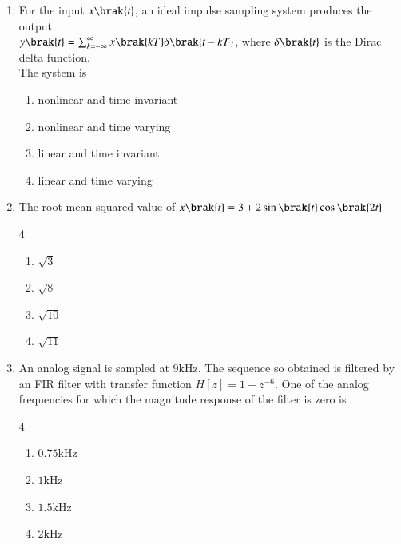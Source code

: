 \documentclass[journal,12pt,onecolumn]{IEEEtran}
\theoremstyle{remark}
\begin{document}
\begin{enumerate}
\vspace{0.5cm}

\item For the input $x\brak{t}$, an ideal impulse sampling system produces the output\\ $y\brak{t}=\sum_{k=-\infty}^{\infty}x\brak{kT}\delta\brak{t-kT}$, where $\delta\brak{t}$ is the Dirac delta function.\\ The system is \par  \hfill{}
    \begin{enumerate}
        \item nonlinear and time invariant
        \item nonlinear and time varying
        \item linear and time invariant
        \item linear and time varying
\end{enumerate} 

\vspace{0.5cm}

\item The root mean squared value of $x\brak{t}=3+2\sin\brak{t}\cos\brak{2t}$ \par  \hfill{}
\begin{multicols}{4}
    \begin{enumerate}
        \item $\sqrt{3}$
        \item $\sqrt{8}$
        \item $\sqrt{10}$
        \item $\sqrt{11}$
\end{enumerate}
\end{multicols} 

\vspace{0.5cm}

\item An analog signal is sampled at $9\text{kHz}$. The sequence so obtained is filtered by an FIR filter with transfer function $H[z]=1-z^{-6}$. One of the analog frequencies for which the magnitude response of the filter is zero is \par  \hfill{}
\begin{multicols}{4}
    \begin{enumerate}
        \item $0.75\text{kHz}$
        \item $1\text{kHz}$
        \item $1.5\text{kHz}$
        \item $2\text{kHz}$
\end{enumerate}
\end{multicols} 


\end{enumerate}
\end{document}
